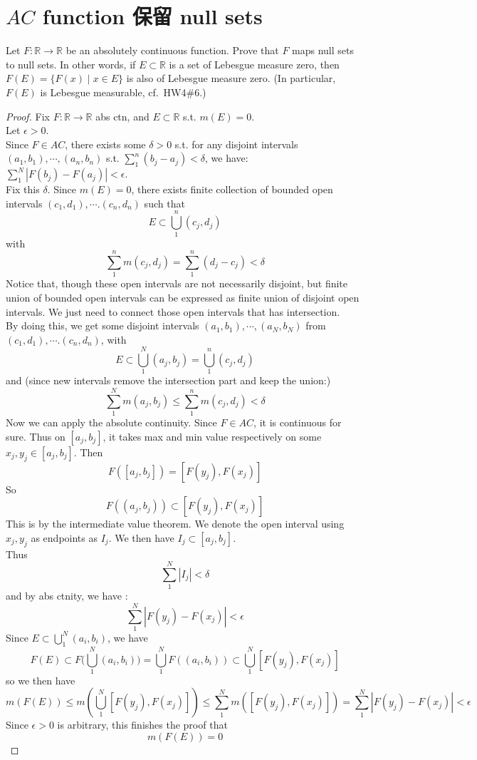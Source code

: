 \documentclass[lang=cn,11pt]{elegantbook}
\begin{document}
\section{$AC$ function 保留 null sets}
  Let $F\colon\mathbb{R}\to\mathbb{R}$ be an absolutely continuous function. Prove that $F$ maps null sets to null sets. In other words, if $E\subset\mathbb{R}$ is a set of Lebesgue measure zero, then $F(E)=\{F(x)\mid x\in E\}$ is also of Lebesgue measure zero. (In particular, $F(E)$ is Lebesgue measurable, cf.\ HW4\#6.)
\begin{proof}
    Fix $F:\mathbb{R}\to \mathbb{R}$ abs ctn, and $E \subset \mathbb{R}$ s.t. $m(E) = 0$.\\
    Let $\epsilon > 0$.\\
    Since $F\in AC$, there exists some $\delta > 0$ s.t. for any disjoint intervals $(a_1,b_1),\cdots, (a_n,b_n)$ s.t. $\sum_{1}^n (b_j -a_j) <\delta$, we have: $\sum_1^N |F(b_j) - F(a_j)| < \epsilon$.\\
    Fix this $\delta$.  Since $m(E) = 0$, there exists finite collection of bounded open intervals $(c_1,d_1),\cdots. (c_n,d_n)$ such that \[
    E \subset \bigcup_1^n (c_j,d_j)
    \]with \[
    \sum_1^n m(c_j,d_j) = \sum_1^n (d_j - c_j) < \delta
    \]
Notice that, though these open intervals are not necessarily disjoint, but finite union of bounded open intervals can be expressed as finite union of disjoint open intervals. We just need to connect those open intervals that has intersection.\\
By doing this, we get some disjoint intervals $(a_1,b_1),\cdots, (a_N,b_N)$ from $(c_1,d_1),\cdots. (c_n,d_n)$, with \[
    E \subset \bigcup_1^N (a_j,b_j) =  \bigcup_1^n (c_j,d_j)
\]
and (since new intervals remove the intersection part and keep the union:)  \[
 \sum_1^N m(a_j,b_j) \leq     \sum_1^n m(c_j,d_j) < \delta
\]
Now we can apply the absolute continuity. Since $F\in AC$, it is continuous for sure. Thus on $[a_j,b_j]$, it takes max and min value respectively on some $x_j, y_j \in [a_j,b_j]$. Then \[
F([a_j,b_j]) = [F(y_j), F(x_j)]
\]
So \[
F((a_j,b_j)) \subset [F(y_j), F(x_j)]
\]
This is by the intermediate value theorem. We denote the open interval using $x_j,y_j$ as endpoints as $I_j$. We then have $I_j \subset [a_j,b_j]$. \\
Thus \[
\sum_1^N |I_j | < \delta
\]and by abs ctnity, we have : \[
\sum_1^N |F(y_j) - F(x_j)| < \epsilon
\]
Since $E \subset \bigcup_1^N (a_i,b_i)$, we have \[
F(E) \subset F\bigg(\bigcup_1^N (a_i,b_i)\bigg) = \bigcup_1^N F((a_i,b_i)) \subset \bigcup_1^N  [F(y_j), F(x_j)]
\]
so we then have\[
m(F(E)) \leq  m( \bigcup_1^N [F(y_j), F(x_j)]) \leq \sum_1^N m([F(y_j), F(x_j)])   = \sum_1^N |F(y_j) - F(x_j)| < \epsilon
\]
Since $\epsilon >0$ is arbitrary, this finishes the proof that \[
m(F(E)) = 0
\]
\end{proof}
\end{document}
